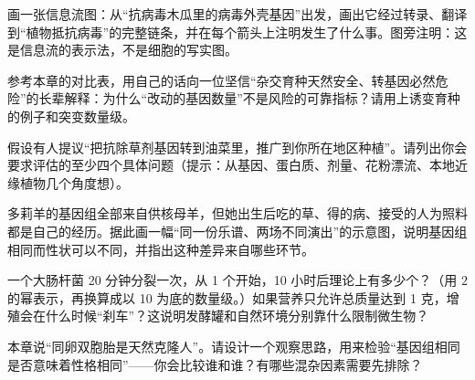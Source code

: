 \begin{sikaoti}
\item 画一张信息流图：从“抗病毒木瓜里的病毒外壳基因”出发，画出它经过转录、翻译到“植物抵抗病毒”的完整链条，并在每个箭头上注明发生了什么事。图旁注明：这是信息流的表示法，不是细胞的写实图。
\item 参考本章的对比表，用自己的话向一位坚信“杂交育种天然安全、转基因必然危险”的长辈解释：为什么“改动的基因数量”不是风险的可靠指标？请用上诱变育种的例子和突变数量级。
\item 假设有人提议“把抗除草剂基因转到油菜里，推广到你所在地区种植”。请列出你会要求评估的至少四个具体问题（提示：从基因、蛋白质、剂量、花粉漂流、本地近缘植物几个角度想）。
\item 多莉羊的基因组全部来自供核母羊，但她出生后吃的草、得的病、接受的人为照料都是自己的经历。据此画一幅“同一份乐谱、两场不同演出”的示意图，说明基因组相同而性状可以不同，并指出这种差异来自哪些环节。
\item 一个大肠杆菌 20 分钟分裂一次，从 1 个开始，10 小时后理论上有多少个？（用 $2$ 的幂表示，再换算成以 10 为底的数量级。）如果营养只允许总质量达到 1 克，增殖会在什么时候“刹车”？这说明发酵罐和自然环境分别靠什么限制微生物？
\item 本章说“同卵双胞胎是天然克隆人”。请设计一个观察思路，用来检验“基因组相同是否意味着性格相同”——你会比较谁和谁？有哪些混杂因素需要先排除？
\end{sikaoti}
